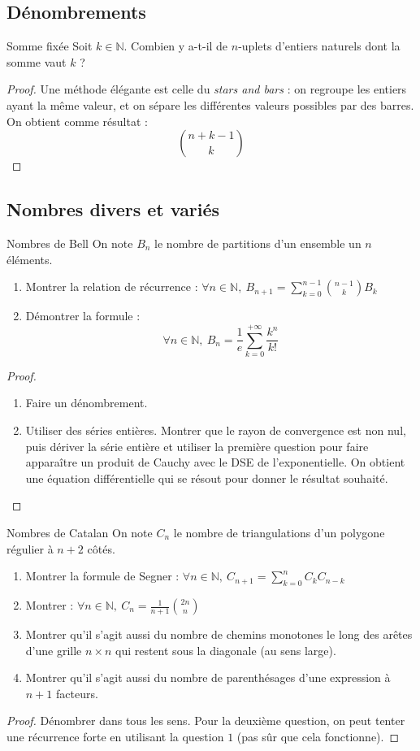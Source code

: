 \documentclass[french]{book}
\newcommand{\N}{\mathbb{N}}
\theoremstyle{plain}
\theoremstyle{definition}
\theoremstyle{remark}
\begin{document}
\subsection{Dénombrements}
\begin{EX}{Somme fixée}
	Soit $k\in\N$. Combien y a-t-il de $n$-uplets d'entiers naturels dont la somme vaut $k$ ?
\end{EX}
\begin{proof}
	Une méthode élégante est celle du \textit{stars and bars} : on regroupe les entiers ayant la même valeur, et on sépare les différentes valeurs possibles par des barres. On obtient comme résultat : $$\binom{n+k-1}{k}$$
\end{proof}
\subsection{Nombres divers et variés}
\begin{EX}{Nombres de Bell}
	On note $B_n$ le nombre de partitions d'un ensemble un $n$ éléments.
	\begin{enumerate}
		\item Montrer la relation de récurrence : $\displaystyle\forall n\in\N,\ B_{n+1}=\sum_{k=0}^{n-1}\binom{n-1}{k}B_k$
		\item Démontrer la formule : $$\forall n\in\N,\ B_n=\frac{1}{e}\sum_{k=0}^{+\infty}\frac{k^n}{k!}$$
	\end{enumerate}
\end{EX}
\begin{proof}
	\begin{enumerate}
	\item Faire un dénombrement.
	\item Utiliser des séries entières. Montrer que le rayon de convergence est non nul, puis dériver la série entière et utiliser la première question pour faire apparaître un produit de Cauchy avec le DSE de l'exponentielle. On obtient une équation différentielle qui se résout pour donner le résultat souhaité.
\end{enumerate}
\end{proof}
\begin{EX}{Nombres de Catalan}
	On note $C_n$ le nombre de triangulations d'un polygone régulier à $n+2$ côtés.
	\begin{enumerate}
		\item Montrer la formule de Segner : $\displaystyle\forall n\in\N,\ C_{n+1}=\sum_{k=0}^{n}C_kC_{n-k}$
		\item Montrer : $\displaystyle\forall n\in\N,\ C_n=\frac{1}{n+1}\binom{2n}{n}$
		\item Montrer qu'il s'agit aussi du nombre de chemins monotones le long des arêtes d'une grille $n\times n$ qui restent sous la diagonale (au sens large).
		\item Montrer qu'il s'agit aussi du nombre de parenthésages d'une expression à $n+1$ facteurs. 
	\end{enumerate}
\end{EX}
\begin{proof}
	Dénombrer dans tous les sens. Pour la deuxième question, on peut tenter une récurrence forte en utilisant la question $1$ (pas sûr que cela fonctionne).
\end{proof}
\end{document}

